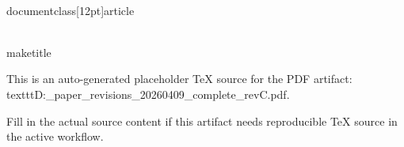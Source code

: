 ﻿\\documentclass[12pt]{article}
\begin{document}
\\maketitle

This is an auto-generated placeholder TeX source for the PDF artifact: \\texttt{D:\working_paper\DANNI\output\doc\main_revisions\main_20260409_complete_revC.pdf}.

Fill in the actual source content if this artifact needs reproducible TeX source in the active workflow.

\
\end{document}
